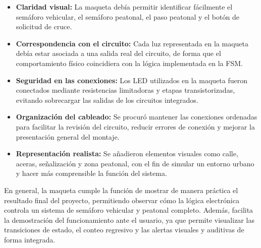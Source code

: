 \documentclass[12pt, journal, onecolumn]{IEEEtran}
\begin{document}
\begin{itemize}
    \item \textbf{Claridad visual:} La maqueta debía permitir identificar fácilmente el semáforo vehicular, el semáforo peatonal, el paso peatonal y el botón de solicitud de cruce.

    \item \textbf{Correspondencia con el circuito:} Cada luz representada en la maqueta debía estar asociada a una salida real del circuito, de forma que el comportamiento físico coincidiera con la lógica implementada en la FSM.

    \item \textbf{Seguridad en las conexiones:} Los LED utilizados en la maqueta fueron conectados mediante resistencias limitadoras y etapas transistorizadas, evitando sobrecargar las salidas de los circuitos integrados.

    \item \textbf{Organización del cableado:} Se procuró mantener las conexiones ordenadas para facilitar la revisión del circuito, reducir errores de conexión y mejorar la presentación general del montaje.

    \item \textbf{Representación realista:} Se añadieron elementos visuales como calle, aceras, señalización y zona peatonal, con el fin de simular un entorno urbano y hacer más comprensible la función del sistema.
\end{itemize}

En general, la maqueta cumple la función de mostrar de manera práctica el resultado final del proyecto, permitiendo observar cómo la lógica electrónica controla un sistema de semáforo vehicular y peatonal completo. Además, facilita la demostración del funcionamiento ante el usuario, ya que permite visualizar las transiciones de estado, el conteo regresivo y las alertas visuales y auditivas de forma integrada.
\end{document}
